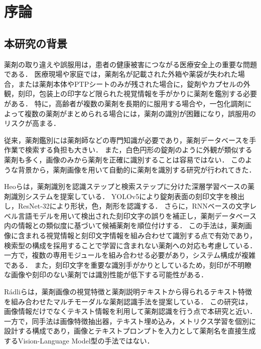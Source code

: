 \documentclass{jsarticle}
\begin{document}
\newpage

\tableofcontents
\newpage
\setcounter{page}{1}
\pagestyle{plain}

\section{序論}\label{sec1}

\subsection{本研究の背景}

薬剤の取り違えや誤服用は，患者の健康被害につながる医療安全上の重要な問題である．
医療現場や家庭では，薬剤名が記載された外箱や薬袋が失われた場合，または薬剤本体やPTPシートのみが残された場合に，錠剤やカプセルの外観，刻印，包装上の印字など限られた視覚情報を手がかりに薬剤を鑑別する必要がある．
特に，高齢者が複数の薬剤を長期的に服用する場合や，一包化調剤によって複数の薬剤がまとめられる場合には，薬剤の識別が困難になり，誤服用のリスクが高まる．

従来，薬剤鑑別には薬剤師などの専門知識が必要であり，薬剤データベースを手作業で検索する負担も大きい．
また，白色円形の錠剤のように外観が類似する薬剤も多く，画像のみから薬剤を正確に識別することは容易ではない．
このような背景から，薬剤画像を用いて自動的に薬剤を識別する研究が行われてきた．

Heoら\cite{heo2023pill}は，薬剤識別を認識ステップと検索ステップに分けた深層学習ベースの薬剤識別システムを提案している．
YOLOv5により錠剤表面の刻印文字を検出し，ResNet-32により形状，色，剤形を認識する．
さらに，RNNベースの文字レベル言語モデルを用いて検出された刻印文字の誤りを補正し，薬剤データベース内の情報との類似度に基づいて候補薬剤を順位付けする．
この手法は，薬剤画像に含まれる視覚情報と刻印文字情報を組み合わせて識別する点で有効であり，検索型の構成を採用することで学習に含まれない薬剤への対応も考慮している．
一方で，複数の専用モジュールを組み合わせる必要があり，システム構成が複雑である．
また，刻印文字を重要な識別手がかりとしているため，刻印が不明瞭な画像や刻印のない薬剤では識別性能が低下する可能性がある．

Rádliら\cite{radli2024metric}は，薬剤画像の視覚特徴と薬剤説明テキストから得られるテキスト特徴を組み合わせたマルチモーダルな薬剤認識手法を提案している．
この研究は，画像情報だけでなくテキスト情報を利用して薬剤認識を行う点で本研究と近い．
一方で，同手法は画像特徴抽出器，テキスト埋め込み，メトリクス学習を個別に設計する構成であり，画像とテキストプロンプトを入力として薬剤名を直接生成するVision-Language Model型の手法ではない．
\end{document}
